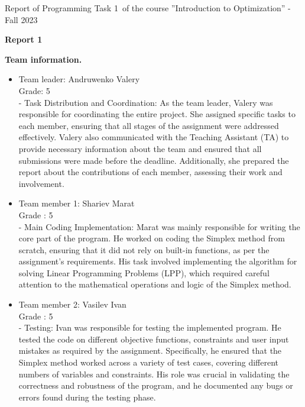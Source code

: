 \documentclass[12pt, legalpaper]{exam}
\newcommand{\course}{Introduction to Optimization}
\newcommand{\term}{Fall 2023}
\newcommand{\examnum}{Report of Programming Task 1}
\begin{document}
\noindent \examnum \, of the  course ''\course'' - \term


\noindent
{}




\vspace{12pt}
\begin{center}
    \textbf{Report 1}
\end{center}

\vspace{12pt}

\noindent  \textbf{Team information.}

\begin{itemize}
    \item Team leader: Andruwenko Valery 
    \\Grade: 5
    \\ - Task Distribution and Coordination: As the team leader, Valery was responsible for coordinating the entire project. She assigned specific tasks to each member, ensuring that all stages of the assignment were addressed effectively. Valery also communicated with the Teaching Assistant (TA) to provide necessary information about the team and ensured that all submissions were made before the deadline. Additionally, she prepared the report about the contributions of each member, assessing their work and involvement.
    \item Team member 1: Shariev Marat 
    \\Grade : 5
    \\ - Main Coding Implementation: Marat was mainly responsible for writing the core part of the program. He worked on coding the Simplex method from scratch, ensuring that it did not rely on built-in functions, as per the assignment's requirements. His task involved implementing the algorithm for solving Linear Programming Problems (LPP), which required careful attention to the mathematical operations and logic of the Simplex method.
    \item Team member 2: Vasilev Ivan
    \\ Grade : 5
    \\- Testing: Ivan was responsible for testing the implemented program. He tested the code on different objective functions, constraints and user input mistakes as required by the assignment. Specifically, he ensured that the Simplex method worked across a variety of test cases, covering different numbers of variables and constraints. His role was crucial in validating the correctness and robustness of the program, and he documented any bugs or errors found during the testing phase.

\end{itemize}
\end{document}
